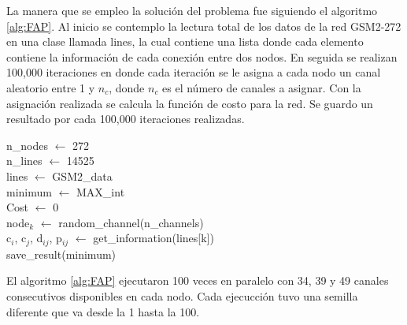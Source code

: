 La manera que se empleo la solución del problema fue siguiendo el algoritmo \ref{alg:FAP}. Al inicio se contemplo la lectura total de los datos de la red GSM2-272 en una clase llamada lines, la cual contiene una lista donde cada elemento contiene la información de cada conexión entre dos nodos. En seguida se realizan 100,000 iteraciones en donde cada iteración se le asigna a cada nodo un canal aleatorio entre 1 y $n_c$, donde $n_c$ es el número de canales a asignar. Con la asignación realizada se calcula la función de costo para la red. Se guardo un resultado por cada 100,000 iteraciones realizadas.

\begin{algorithm}[H]
    \caption{}
    \label{alg:FAP}
    n\_nodes $\gets$ 272\\
    n\_lines $\gets$ 14525\\
    lines $\gets$ GSM2\_data\\
    minimum $\gets$ MAX\_int\\
    {
        Cost $\gets$  0\\
        {
            node$_k$ $\gets$ random\_channel(n\_channels)\\
        }
        {
            c$_i$, c$_j$, d$_{ij}$, p$_{ij}$ $\gets$ get\_information(lines[k])\\
        }
    }
    save\_result(minimum)\\
\end{algorithm}

El algoritmo \ref{alg:FAP} ejecutaron 100 veces en paralelo con 34, 39 y 49 canales consecutivos disponibles en cada nodo. Cada ejecucción tuvo una semilla diferente que va desde la 1 hasta la 100.